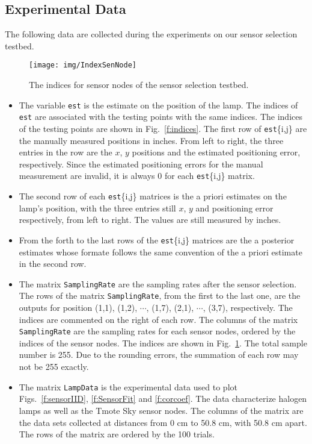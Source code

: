 \subsection{Experimental Data}
The following data are collected during the experiments on our sensor selection testbed.

\begin{figure}
\centering
\texttt{[image: img/IndexSenNode]}
\caption{The indices for sensor nodes of the sensor selection testbed.}\label{f:indSenNode}
\end{figure}
\afterpage{\clearpage}


\begin{itemize}
\item The variable \verb!est! is the estimate on the position of the lamp. The indices of \verb!est! are associated with the testing points with the same indices. The indices of the testing points are shown in Fig.~\ref{f:indices}. The first row of \verb!est!\{i,j\} are the manually measured positions in inches. From left to right, the three entries in the row are the $x$, $y$ positions and the estimated positioning error, respectively. Since the estimated positioning errors for the manual measurement are invalid, it is always 0 for each \verb!est!\{i,j\} matrix.
\item The second row of each \verb!est!\{i,j\} matrices is the a priori estimates on the lamp's position, with the three entries still $x$, $y$ and positioning error respectively, from left to right. The values are still measured by inches.
\item From the forth to the last rows of the \verb!est!\{i,j\} matrices are the a posterior estimates whose formate follows the same convention of the a priori estimate in the second row.
\item The matrix \verb!SamplingRate! are the sampling rates after the sensor selection.
    The rows of the matrix \verb!SamplingRate!, from the first to the last one, are the outputs for position (1,1), (1,2), $\cdots$, (1,7), (2,1), $\cdots$, (3,7), respectively. The indices are commented on the right of each row.
    The columns of the matrix \verb!SamplingRate! are the sampling rates for each sensor nodes, ordered by the indices of the sensor nodes. The indices are shown in Fig.~\ref{f:indSenNode}.
        The total sample number is 255. Due to the rounding errors, the summation of each row may not be 255 exactly.
\item The matrix \verb!LampData! is the experimental data used to plot Figs.~\ref{f:sensorIID}, \ref{f:SensorFit} and \ref{f:corcoef}. The data characterize halogen lamps as well as the Tmote Sky sensor nodes.
     The columns of the matrix are the data sets collected at distances from 0 cm to 50.8 cm, with 50.8 cm apart. The rows of the matrix are ordered by the 100 trials.
\end{itemize}



